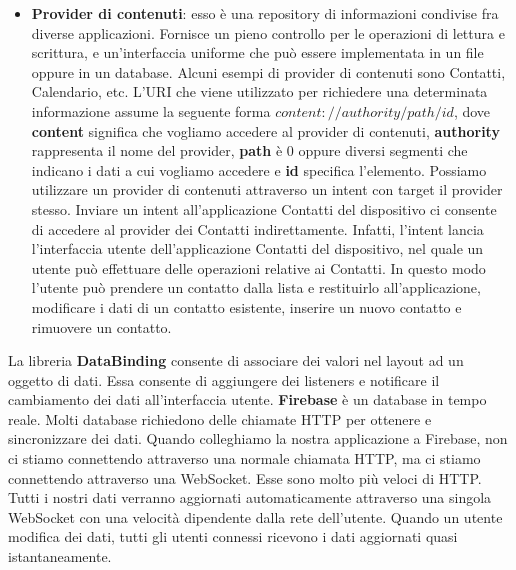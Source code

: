 \begin{itemize}
\item \textbf{Provider di contenuti}: esso è una repository di informazioni condivise fra diverse applicazioni. Fornisce un pieno controllo per le operazioni di lettura e scrittura, e un'interfaccia uniforme che può essere implementata in un file oppure in un database. Alcuni esempi di provider di contenuti sono Contatti, Calendario, etc. L'URI che viene utilizzato per richiedere una determinata informazione assume la seguente forma $content://authority/path/id$, dove \textbf{content} significa che vogliamo accedere al provider di contenuti, \textbf{authority} rappresenta il nome del provider, \textbf{path} è 0 oppure diversi segmenti che indicano i dati a cui vogliamo accedere e \textbf{id} specifica l'elemento. Possiamo utilizzare un provider di contenuti attraverso un intent con target il provider stesso. Inviare un intent all'applicazione Contatti del dispositivo ci consente di accedere al provider dei Contatti indirettamente. Infatti, l'intent lancia l'interfaccia utente dell'applicazione Contatti del dispositivo, nel quale un utente può effettuare delle operazioni relative ai Contatti. In questo modo l'utente può prendere un contatto dalla lista e restituirlo all'applicazione, modificare i dati di un contatto esistente, inserire un nuovo contatto e rimuovere un contatto.
\end{itemize}
La libreria \textbf{DataBinding} consente di associare dei valori nel layout ad un oggetto di dati. Essa consente di aggiungere dei listeners e notificare il cambiamento dei dati all'interfaccia utente. \textbf{Firebase} è un database in tempo reale. Molti database richiedono delle chiamate HTTP per ottenere e sincronizzare dei dati. Quando colleghiamo la nostra applicazione a Firebase, non ci stiamo connettendo attraverso una normale chiamata HTTP, ma ci stiamo connettendo attraverso una WebSocket. Esse sono molto più veloci di HTTP. Tutti i nostri dati verranno aggiornati automaticamente attraverso una singola WebSocket con una velocità dipendente dalla rete dell'utente. Quando un utente modifica dei dati, tutti gli utenti connessi ricevono i dati aggiornati quasi istantaneamente.
